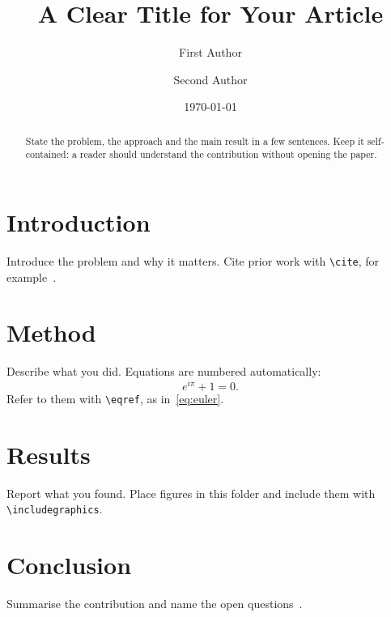 \documentclass[11pt,a4paper]{article}
\title{A Clear Title for Your Article}
\author{First Author \and Second Author}
\date{\today}
\begin{document}
\maketitle

\begin{abstract}
State the problem, the approach and the main result in a few sentences.
Keep it self-contained: a reader should understand the contribution
without opening the paper.
\end{abstract}

\section{Introduction}
Introduce the problem and why it matters. Cite prior work with
\verb|\cite|, for example~\cite{knuth1984texbook}.

\section{Method}
Describe what you did. Equations are numbered automatically:
\begin{equation}
  \label{eq:euler}
  e^{i\pi} + 1 = 0.
\end{equation}
Refer to them with \verb|\eqref|, as in~\eqref{eq:euler}.

\section{Results}
Report what you found. Place figures in this folder and include them with
\verb|\includegraphics|.

\section{Conclusion}
Summarise the contribution and name the open questions~\cite{lamport1994latex}.



\end{document}
